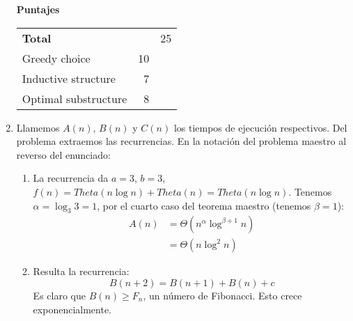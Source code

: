 \documentclass[english, spanish, fleqn]{article}
\begin{document}
\begin{enumerate}
    \vspace*{2\baselineskip}
    \begin{minipage}{1.0\linewidth}
      {\Large\textbf{Puntajes}}\\[0.5\baselineskip]
      \begin{tabular}{lrr}
	\textbf{Total}					     &	  & 25 \\
	Greedy choice					     & 10 &    \\
	Inductive structure				     &	7 &    \\
	Optimal substructure				     &	8 &
      \end{tabular}
    \end{minipage}
\pagebreak[4]
  \item %
    Llamemos \(A(n)\), \(B(n)\) y \(C(n)\)
    los tiempos de ejecución respectivos.
    Del problema extraemos las recurrencias.
    En la notación del problema maestro al reverso del enunciado:
    \begin{enumerate}[label = \textbf{Algoritmo \Alph*:}]
    \item %
      La recurrencia da \(a = 3\),
      \(b = 3\),
      \(f(n) = Theta(n \log n) + Theta(n) = Theta(n \log n)\).
      Tenemos \(\alpha = \log_3 3 = 1\),
      por el cuarto caso del teorema maestro
      (tenemos \(\beta = 1\)):
      \begin{align*}
	A(n)
	  &= \Theta(n^\alpha \log^{\beta + 1} n) \\
	  &= \Theta(n \log^2 n)
      \end{align*}
    \item %
      Resulta la recurrencia:
      \begin{equation*}
	B(n + 2)
	  = B(n + 1) + B(n) + c
      \end{equation*}
      Es claro que \(B(n) \ge F_n\),
      un número de Fibonacci.
      Esto crece exponencialmente.


\end{enumerate}
\end{enumerate}
\end{document}
